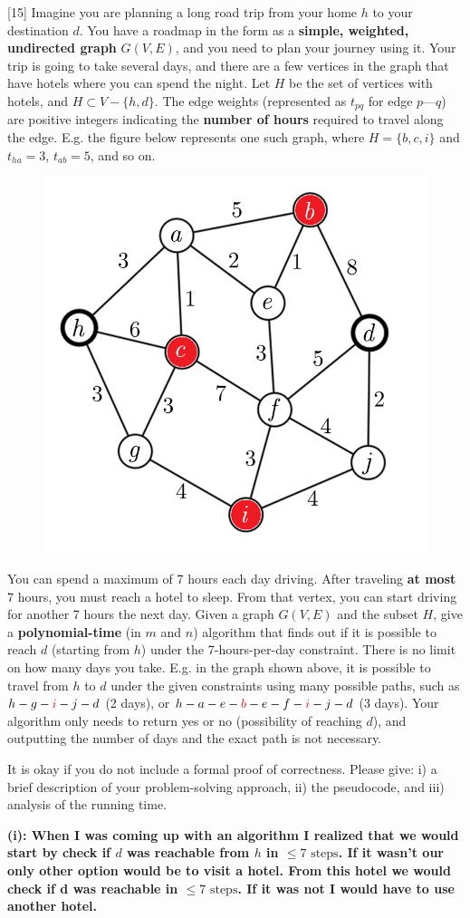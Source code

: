 \documentclass[addpoints]{exam}
\begin{document}
\begin{questions}
[15]
Imagine you are planning a long road trip from your home $h$ to your destination $d$. You have a roadmap in the form as a \textbf{simple, weighted, undirected graph} $G(V,E)$, and you need to plan your journey using it. Your trip is going to take several days, and there are a few vertices in the graph that have hotels where you can spend the night. Let $H$ be the set of vertices with hotels, and $H \subset V-\{h,d\}$. The edge weights (represented as $t_{pq}$ for edge $p$---$q$) are positive integers indicating the \textbf{number of hours} required to travel along the edge. E.g. the figure below represents one such graph, where $H=\{b,c,i\}$ and $t_{ha}=3$, $t_{ab}=5$, and so on.

\begin{figure}[h!]
    \centering
    \includegraphics[width=0.35\linewidth]{hotels.png}
\end{figure}

You can spend a maximum of 7 hours each day driving. After traveling \textbf{at most} 7 hours, you must reach a hotel to sleep. From that vertex, you can start driving for another 7 hours the next day. Given a graph $G(V,E)$ and the subset $H$, give a \textbf{polynomial-time} (in $m$ and $n$) algorithm that finds out if it is possible to reach $d$ (starting from $h$) under the 7-hours-per-day constraint. There is no limit on how many days you take. E.g. in the graph shown above, it is possible to travel from $h$ to $d$ under the given constraints using many possible paths, such as $h-g-\textcolor{red}{i}-j-d$ (2 days), or $h-a-e-\textcolor{red}{b}-e-f-\textcolor{red}{i}-j-d$ (3 days). Your algorithm only needs to return yes or no (possibility of reaching $d$), and outputting the number of days and the exact path is not necessary.

It is okay if you do not include a formal proof of correctness. Please give: i) a brief description of your problem-solving approach, ii) the pseudocode, and iii) analysis of the running time. 

\textbf{(i): When I was coming up with an algorithm I realized that we would start by check if $d$ was reachable from $h$ in $\le 7 \text{ steps}$. If it wasn't our only other option would be to visit a hotel. From this hotel we would check if d was reachable in $\le 7 \text{ steps}$. If it was not I would have to use another hotel.}


\end{questions}
\end{document}
